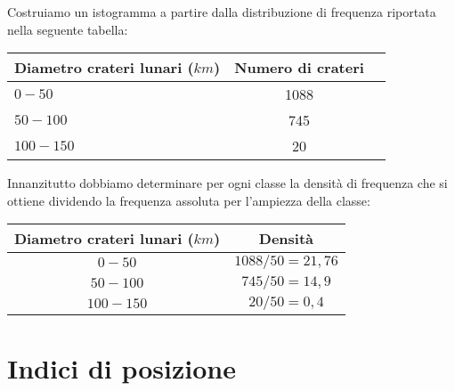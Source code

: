  \begin{esempio}

Costruiamo un istogramma a partire dalla distribuzione di frequenza 
riportata nella seguente tabella:
\begin{center}
\begin{tabular}{lcc}
\toprule
Diametro crateri lunari (\(\unit{km}\)) & Numero di crateri\\
\midrule
\(0-50\) & 1088 \\
\(50-100\) & 745 \\
\(100-150\) & 20 \\
\bottomrule
\end{tabular}
\end{center}

Innanzitutto dobbiamo determinare per ogni classe la densità di frequenza 
che si ottiene dividendo la frequenza assoluta per l'ampiezza della classe:

\begin{center}
\begin{minipage}{.6\textwidth}
\begin{tabular}{cc}
\toprule
Diametro crateri lunari (\(\unit{km}\)) & Densità\\
\midrule
\(0-50\) & \(1088/50=21,76\) \\
\(50-100\) & \(745/50=14,9\) \\
\(100-150\) & \(20/50=0,4\) \\
\bottomrule
\end{tabular}
\end{minipage} 
\begin{minipage}{.38\textwidth}
\begin{inaccessibleblock}
\scalebox{.7}{}
\end{inaccessibleblock}
\end{minipage}
\end{center}

\end{esempio}



\section{Indici di posizione}
\label{sec:stat02_posizione}

